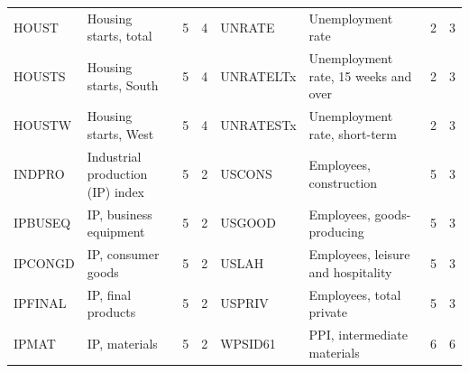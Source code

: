 {\begin{longtable}{l>{\raggedright\arraybackslash}p{3.4cm}cc@{\hskip 1.2em}l>{\raggedright\arraybackslash}p{3.4cm}cc}
HOUST & Housing starts, total & 5 & 4 & UNRATE & Unemployment rate & 2 & 3 \\
HOUSTS & Housing starts, South & 5 & 4 & UNRATELTx & Unemployment rate, 15 weeks and over & 2 & 3 \\
HOUSTW & Housing starts, West & 5 & 4 & UNRATESTx & Unemployment rate, short-term & 2 & 3 \\
INDPRO & Industrial production (IP) index & 5 & 2 & USCONS & Employees, construction & 5 & 3 \\
IPBUSEQ & IP, business equipment & 5 & 2 & USGOOD & Employees, goods-producing & 5 & 3 \\
IPCONGD & IP, consumer goods & 5 & 2 & USLAH & Employees, leisure and hospitality & 5 & 3 \\
IPFINAL & IP, final products & 5 & 2 & USPRIV & Employees, total private & 5 & 3 \\
IPMAT & IP, materials & 5 & 2 & WPSID61 & PPI, intermediate materials & 6 & 6 \\
\end{longtable}
}
